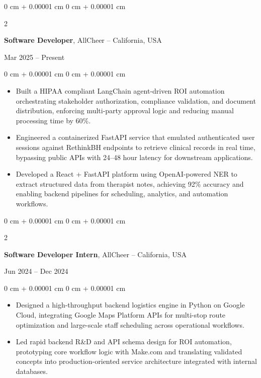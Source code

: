 \documentclass[10pt, letterpaper]{article}
\newenvironment{highlights}{
    \begin{itemize}[
        topsep=0.10 cm,
        parsep=0.10 cm,
        partopsep=0pt,
        itemsep=0pt,
        leftmargin=0 cm + 10pt
    ]
}{
    \end{itemize}
} %
\newenvironment{onecolentry}{
    \begin{adjustwidth}{
        0 cm + 0.00001 cm
    }{
        0 cm + 0.00001 cm
    }
}{
    \end{adjustwidth}
} %
\newenvironment{twocolentry}[2][]{
    \onecolentry
    \def\secondColumn{#2}
    \setcolumnwidth{\fill, 4.5 cm}
    \begin{paracol}{2}
}{
    \switchcolumn \raggedleft \secondColumn
    \end{paracol}
    \endonecolentry
} %
\renewenvironment{highlights}{
    \begin{itemize}[
        topsep=0.05cm,
        parsep=0.10cm,
        partopsep=1pt,
        itemsep=0pt,
        leftmargin=0cm + 10pt
    ]
}{
    \end{itemize}
}
\begin{document}
\begin{twocolentry}{Mar 2025 -- Present}
\textbf{Software Developer}, AllCheer -- California, USA
\end{twocolentry}
\vspace{0.05cm}
\begin{onecolentry}
\begin{highlights}
\item Built a HIPAA compliant LangChain agent-driven ROI automation orchestrating stakeholder authorization, compliance validation, and document distribution, enforcing multi-party approval logic and reducing manual processing time by 60\%.

    \item Engineered a containerized FastAPI service that emulated authenticated user sessions against RethinkBH endpoints to retrieve clinical records in real time, bypassing public APIs with 24--48 hour latency for downstream applications.
    \item Developed a React + FastAPI platform using OpenAI-powered NER to extract structured data from therapist notes, achieving 92\% accuracy and enabling backend pipelines for scheduling, analytics, and automation workflows.
\end{highlights}
\end{onecolentry}
\vspace{0.3cm}

\begin{twocolentry}{Jun 2024 -- Dec 2024}
\textbf{Software Developer Intern}, AllCheer -- California, USA
\end{twocolentry}
\vspace{0.05cm}
\begin{onecolentry}
\begin{highlights}
    \item Designed a high-throughput backend logistics engine in Python on Google Cloud, integrating Google Maps Platform APIs for multi-stop route optimization and large-scale staff scheduling across operational workflows.
    \item Led rapid backend R\&D and API schema design for ROI automation, prototyping core workflow logic with Make.com and translating validated concepts into production-oriented service architecture integrated with internal databases.
\end{highlights}
\end{onecolentry}
\vspace{0.3cm}
\end{document}
